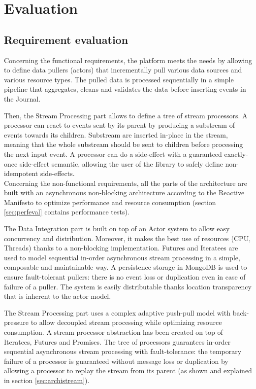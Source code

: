 \chapter{Evaluation}

\section{Requirement evaluation}

Concerning the functional requirements, the platform meets the needs by allowing to define data pullers (actors) that incrementally pull various data sources and various resource types.
The pulled data is processed sequentially in a simple pipeline that aggregates, cleans and validates the data before inserting events in the Journal.

Then, the Stream Processing part allows to define a tree of stream processors. A processor can react to events sent by its parent by producing a substream of events towards its children. Substream are inserted in-place in the stream, meaning that the whole substream should be sent to children before processing the next input event. A processor can do a side-effect with a guaranteed exactly-once side-effect semantic, allowing the user of the library to safely define non-idempotent side-effects.
\\

Concerning the non-functional requirements, all the parts of the architecture are built with an asynchronous non-blocking architecture according to the Reactive Manifesto 
 to optimize performance and resource consumption (section \ref{sec:perfeval} contains performance tests).

The Data Integration part is built on top of an Actor system to allow easy concurrency and distribution. Moreover, it makes the best use of resources (CPU, Threads) thanks to a non-blocking implementation. Futures and Iteratees are used to model sequential in-order asynchronous stream processing in a simple, composable and maintainable way. A persistence storage
in MongoDB is used to ensure fault-tolerant pullers: there is no event loss or duplication even in case of failure of a puller. The system is easily distributable 
thanks location transparency that is inherent to the actor model.

The Stream Processing part uses a complex adaptive push-pull model with back-pressure to allow decoupled stream processing while optimizing resource consumption. A stream processor abstraction has been created on top of Iteratees, Futures and Promises. The tree of processors guarantees in-order sequential asynchronous stream processing with fault-tolerance: the temporary failure of a processor is guaranteed without message loss or duplication by allowing a processor to replay the stream from its parent (as shown and explained in section 
\ref{sec:archistream}).


